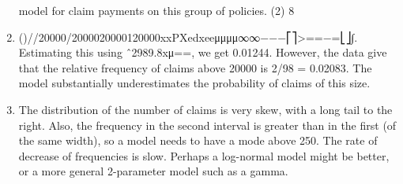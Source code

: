 \documentclass[a4paper,12pt]{article}
\begin{document}
\begin{enumerate}
\begin{framed}
model for claim payments on this group of policies.
(2)
8
\end{framed}
\item 
()//20000/2000020000120000xxPXedxeeμμμμ∞∞−−−⎡⎤>==−=⎣⎦∫.
Estimating this using ˆ2989.8xμ==, we get 0.01244.
However, the data give that the relative frequency of claims above 20000 is 2/98 = 0.02083. The model substantially underestimates the probability of claims of this size.
\item  The distribution of the number of claims is very skew, with a long tail to the right. Also, the frequency in the second interval is greater than in the first (of the same width), so a model needs to have a mode above 250. The rate of decrease of frequencies is slow. Perhaps a log-normal model might be better, or a more general 2-parameter model such as a gamma.
\end{enumerate}
\end{document}
